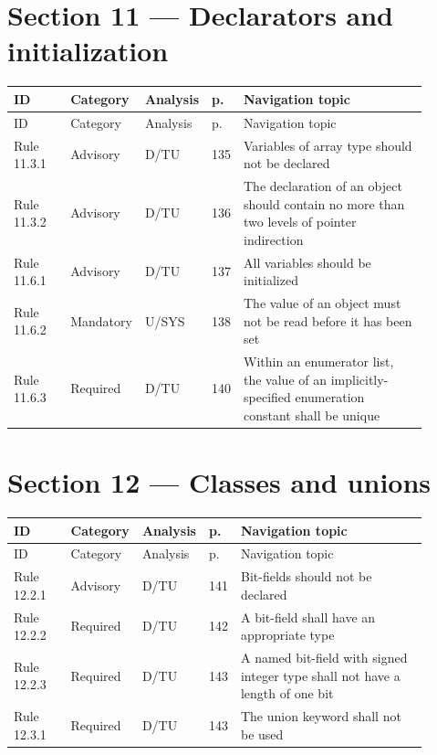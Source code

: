 \documentclass[10pt,letterpaper]{article}
\begin{document}
\section{Section 11 --- Declarators and initialization}
\small\setlength{\tabcolsep}{3pt}\renewcommand{\arraystretch}{1.15}
\begin{longtable}{p{0.14\linewidth}p{0.14\linewidth}p{0.1\linewidth}p{0.045\linewidth}p{0.475\linewidth}}
\toprule
ID & Category & Analysis & p. & Navigation topic\\ \midrule
\endfirsthead
\toprule
ID & Category & Analysis & p. & Navigation topic\\ \midrule
\endhead
Rule 11.3.1 & Advisory & D/TU & 135 & Variables of array type should not be declared\\
Rule 11.3.2 & Advisory & D/TU & 136 & The declaration of an object should contain no more than two levels of pointer indirection\\
Rule 11.6.1 & Advisory & D/TU & 137 & All variables should be initialized\\
Rule 11.6.2 & Mandatory & U/SYS & 138 & The value of an object must not be read before it has been set\\
Rule 11.6.3 & Required & D/TU & 140 & Within an enumerator list, the value of an implicitly-specified enumeration constant shall be unique\\
\bottomrule
\end{longtable}
\normalsize

\section{Section 12 --- Classes and unions}
\small\setlength{\tabcolsep}{3pt}\renewcommand{\arraystretch}{1.15}
\begin{longtable}{p{0.14\linewidth}p{0.14\linewidth}p{0.1\linewidth}p{0.045\linewidth}p{0.475\linewidth}}
\toprule
ID & Category & Analysis & p. & Navigation topic\\ \midrule
\endfirsthead
\toprule
ID & Category & Analysis & p. & Navigation topic\\ \midrule
\endhead
Rule 12.2.1 & Advisory & D/TU & 141 & Bit-fields should not be declared\\
Rule 12.2.2 & Required & D/TU & 142 & A bit-field shall have an appropriate type\\
Rule 12.2.3 & Required & D/TU & 143 & A named bit-field with signed integer type shall not have a length of one bit\\
Rule 12.3.1 & Required & D/TU & 143 & The union keyword shall not be used\\
\bottomrule
\end{longtable}
\normalsize
\end{document}
